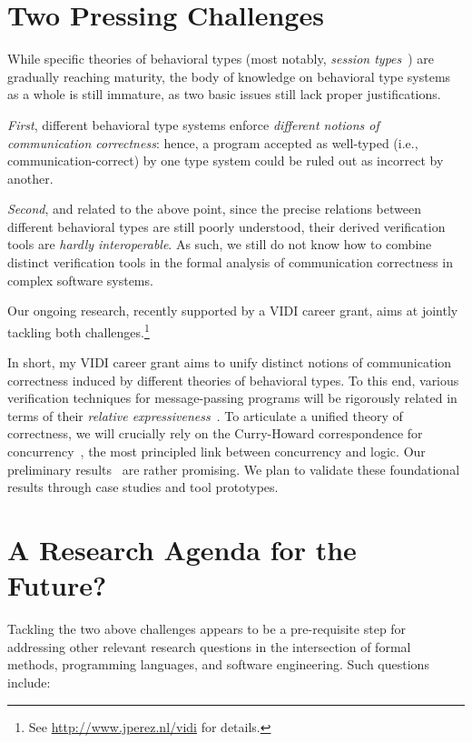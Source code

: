 \documentclass[sigplan,10pt]{acmart}\settopmatter{printfolios=false,printccs=false,printacmref=false}
\begin{document}
\section{Two Pressing Challenges}
While specific theories of behavioral types (most notably, \emph{session types}~\cite{DBLP:conf/esop/HondaVK98,DBLP:conf/popl/HondaYC08}) are gradually reaching maturity, 
the body of knowledge on behavioral type systems as a whole is still {immature}, as two basic issues still lack proper justifications. 

\emph{First}, 
different behavioral type systems  enforce \emph{different notions of communication correctness}: hence, a 
program accepted as 
well-typed (i.e., communication-correct) by one type system could be ruled out as incorrect by another.

\emph{Second}, and related to the above point,
since the precise relations between different behavioral types are still poorly understood, their derived verification tools are \emph{hardly interoperable}. As such, we still do not know how to combine distinct verification tools in the formal analysis of communication correctness in complex software systems.

Our ongoing research, recently supported by a VIDI career grant, aims at jointly tackling both challenges.\footnote{See \url{http://www.jperez.nl/vidi} for details.}

In short,  my VIDI career grant aims to unify distinct notions of communication correctness induced by different theories of behavioral types. 
To this end, various verification techniques for message-passing programs will be rigorously related in terms of their \emph{relative expressiveness}~\cite{DBLP:conf/forte/Perez16}. 
To articulate a unified theory of correctness,
we will crucially rely on the Curry-Howard correspondence for concurrency~\cite{DBLP:conf/tldi/CairesPT12}, the most principled link between concurrency and logic. 
Our preliminary results~\cite{DBLP:journals/corr/DardhaP15,KPY2016,DBLP:conf/forte/CairesP16} are rather promising.
We plan to validate these  foundational results  through case studies and tool prototypes.

\section{A  Research Agenda for the Future?}
Tackling the two above challenges appears to be a pre-req\-ui\-site step for addressing other relevant research questions in the intersection of  formal methods, programming languages, and software engineering. Such questions include:
\end{document}
